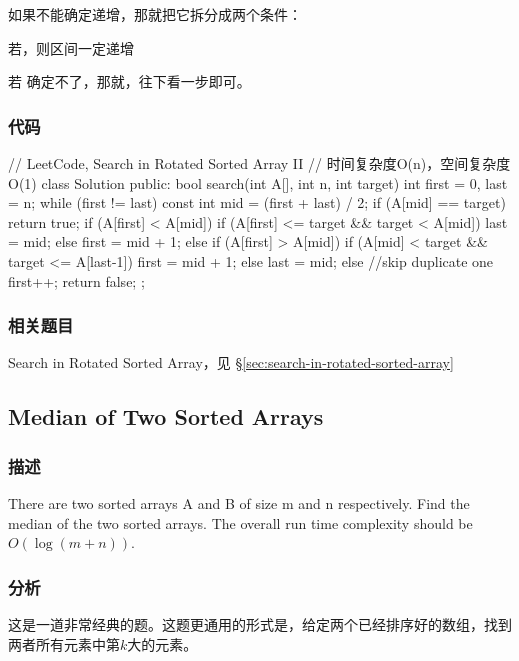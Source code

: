 如果不能确定递增，那就把它拆分成两个条件：
\begindot
\item 若，则区间\fn{[l,m]}一定递增
\item 若 确定不了，那就，往下看一步即可。
\myenddot

\subsubsection{代码}
\begin{Code}
// LeetCode, Search in Rotated Sorted Array II
// 时间复杂度O(n)，空间复杂度O(1)
class Solution {
public:
    bool search(int A[], int n, int target) {
        int first = 0, last = n;
        while (first != last) {
            const int mid = (first + last) / 2;
            if (A[mid] == target)
                return true;
            if (A[first] < A[mid]) {
                if (A[first] <= target && target < A[mid])
                    last = mid;
                else
                    first = mid + 1;
            } else if (A[first] > A[mid]) {
                if (A[mid] < target && target <= A[last-1])
                    first = mid + 1;
                else
                    last = mid;
            } else
                //skip duplicate one
                first++;
        }
        return false;
    }
};
\end{Code}


\subsubsection{相关题目}

\begindot
\item Search in Rotated Sorted Array，见 \S \ref{sec:search-in-rotated-sorted-array}
\myenddot


\subsection{Median of Two Sorted Arrays}
\label{sec:median-of-two-sorted-arrays}


\subsubsection{描述}
There are two sorted arrays A and B of size m and n respectively. Find the median of the two sorted arrays. The overall run time complexity should be $O(\log (m+n))$.


\subsubsection{分析}
这是一道非常经典的题。这题更通用的形式是，给定两个已经排序好的数组，找到两者所有元素中第$k$大的元素。

